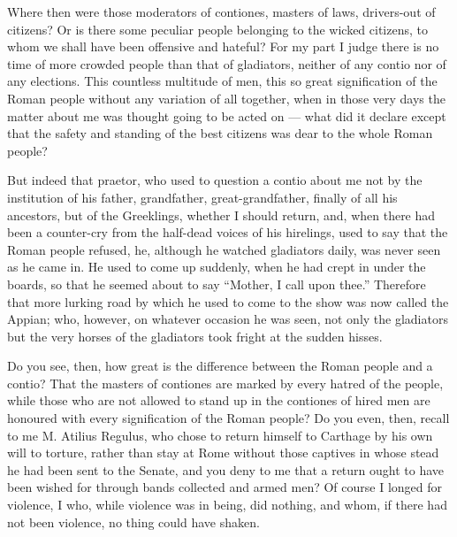  Where then were those moderators of contiones, masters of laws, drivers-out of citizens? Or is there some peculiar people belonging to the wicked citizens, to whom we shall have been offensive and hateful? For my part I judge there is no time of more crowded people than that of gladiators, neither of any contio nor of any elections. This countless multitude of men, this so great signification of the Roman people without any variation of all together, when in those very days the matter about me was thought going to be acted on --- what did it declare except that the safety and standing of the best citizens was dear to the whole Roman people?

 But indeed that praetor, who used to question a contio about me not by the institution of his father, grandfather, great-grandfather, finally of all his ancestors, but of the Greeklings, whether I should return, and, when there had been a counter-cry from the half-dead voices of his hirelings, used to say that the Roman people refused, he, although he watched gladiators daily, was never seen as he came in. He used to come up suddenly, when he had crept in under the boards, so that he seemed about to say ``Mother, I call upon thee.'' Therefore that more lurking road by which he used to come to the show was now called the Appian; who, however, on whatever occasion he was seen, not only the gladiators but the very horses of the gladiators took fright at the sudden hisses.

 Do you see, then, how great is the difference between the Roman people and a contio? That the masters of contiones are marked by every hatred of the people, while those who are not allowed to stand up in the contiones of hired men are honoured with every signification of the Roman people? Do you even, then, recall to me M. Atilius Regulus, who chose to return himself to Carthage by his own will to torture, rather than stay at Rome without those captives in whose stead he had been sent to the Senate, and you deny to me that a return ought to have been wished for through bands collected and armed men? Of course I longed for violence, I who, while violence was in being, did nothing, and whom, if there had not been violence, no thing could have shaken.


